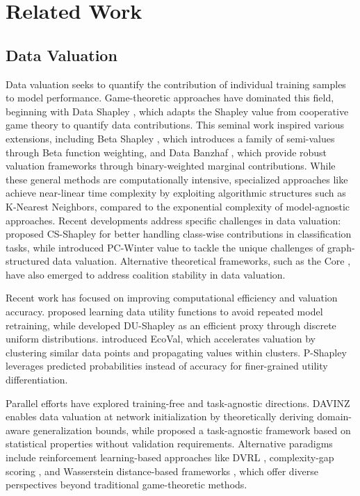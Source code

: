 \section{Related Work}
\label{sec:related}
\subsection{Data Valuation}\label{sec:related_dv}

Data valuation seeks to quantify the contribution of individual training samples to model performance. Game-theoretic approaches have dominated this field, beginning with Data Shapley \citep{ghorbani2019data}, which adapts the Shapley value from cooperative game theory to quantify data contributions. This seminal work inspired various extensions, including Beta Shapley \citep{kwon2021beta}, which introduces a family of semi-values through Beta function weighting, and Data Banzhaf \citep{wang2023data}, which provide robust valuation frameworks through binary-weighted marginal contributions. While these general methods are computationally intensive, specialized approaches like \citep{jia2019efficient} achieve near-linear time complexity by exploiting algorithmic structures such as K-Nearest Neighbors, compared to the exponential complexity of model-agnostic approaches. Recent developments address specific challenges in data valuation: \citet{schoch2022cs} proposed CS-Shapley for better handling class-wise contributions in classification tasks, while \citet{chi2024precedence} introduced PC-Winter value to tackle the unique challenges of graph-structured data valuation. Alternative theoretical frameworks, such as the Core \citep{yan2021if}, have also emerged to address coalition stability in data valuation. 

Recent work has focused on improving computational efficiency and valuation accuracy. \citet{wang2021improving} proposed learning data utility functions to avoid repeated model retraining, while \citet{garrido2023shapley} developed DU-Shapley as an efficient proxy through discrete uniform distributions. \citet{tarun2024ecoval} introduced EcoVal, which accelerates valuation by clustering similar data points and propagating values within clusters. P-Shapley \citep{xia2024p} leverages predicted probabilities instead of accuracy for finer-grained utility differentiation. 

Parallel efforts have explored training-free and task-agnostic directions. DAVINZ \citep{wu2022davinz} enables data valuation at network initialization by theoretically deriving domain-aware generalization bounds, while \citet{amiri2023fundamentals} proposed a task-agnostic framework based on statistical properties without validation requirements. Alternative paradigms include reinforcement learning-based approaches like DVRL \citep{yoon2020data}, complexity-gap scoring \citep{nohyun2022data}, and Wasserstein distance-based frameworks \citep{just2023lava}, which offer diverse perspectives beyond traditional game-theoretic methods.


